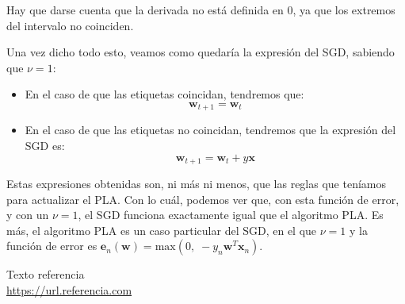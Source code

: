 \documentclass[11pt,a4paper]{article}
\newcommand{\maximum}{\text{max}}
\begin{document}
Hay que darse cuenta que la derivada no está definida en 0, ya que los extremos del intervalo no coinciden.

Una vez dicho todo esto, veamos como quedaría la expresión del SGD, sabiendo que $\nu = 1$:

\begin{itemize}
	\item En el caso de que las etiquetas coincidan, tendremos que:
	\begin{equation}
		\mathbf{w}_{t+1} = \mathbf{w}_{t}
	\end{equation}
	\item En el caso de que las etiquetas no coincidan, tendremos que la expresión del SGD es:
	\begin{equation}
		\mathbf{w}_{t+1} = \mathbf{w}_{t} + y\mathbf{x}
	\end{equation}
\end{itemize}

Estas expresiones obtenidas son, ni más ni menos, que las reglas que teníamos para actualizar el PLA. Con lo cuál, podemos ver
que, con esta función de error, y con un $\nu = 1$, el SGD funciona exactamente igual que el algoritmo PLA. Es más, el
algoritmo PLA es un caso particular del SGD, en el que $\nu = 1$ y la función de error es
$\mathbf{e}_n(\mathbf{w}) = \maximum(0, \; -y_n\mathbf{w}^T\mathbf{x}_n)$.

\newpage

\begin{thebibliography}{5}

Texto referencia
\\\url{https://url.referencia.com}

\end{thebibliography}
\end{document}

